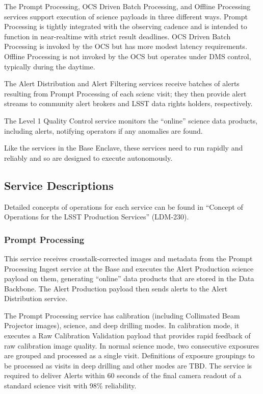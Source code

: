 \documentclass[DM,lsstdraft,toc]{lsstdoc}
\begin{document}
The Prompt Processing, OCS Driven Batch Processing, and Offline
Processing services support execution of science payloads in three
different ways. Prompt Processing is tightly integrated with the
observing cadence and is intended to function in near-realtime with
strict result deadlines. OCS Driven Batch Processing is invoked by the
OCS but has more modest latency requirements. Offline Processing is not
invoked by the OCS but operates under DMS control, typically during the
daytime.

The Alert Distribution and Alert Filtering services receive batches of
alerts resulting from Prompt Processing of each scienc visit; they then
provide alert streams to community alert brokers and LSST data rights
holders, respectively.

The Level 1 Quality Control service monitors the ``online'' science data
products, including alerts, notifying operators if any anomalies are
found.

Like the services in the Base Enclave, these services need to run
rapidly and reliably and so are designed to execute autonomously.

\subsection{Service Descriptions}\label{service-descriptions-1}

Detailed concepts of operations for each service can be found in
``Concept of Operations for the LSST Production Services'' (LDM-230).

\subsubsection{Prompt Processing}\label{prompt-processing}

This service receives crosstalk-corrected images and metadata from the
Prompt Processing Ingest service at the Base and executes the Alert
Production science payload on them, generating ``online'' data products
that are stored in the Data Backbone. The Alert Production payload then
sends alerts to the Alert Distribution service.

The Prompt Processing service has calibration (including Collimated Beam
Projector images), science, and deep drilling modes. In calibration
mode, it executes a Raw Calibration Validation payload that provides
rapid feedback of raw calibration image quality. In normal science mode,
two consecutive exposures are grouped and processed as a single visit.
Definitions of exposure groupings to be processed as visits in deep
drilling and other modes are TBD. The service is required to deliver
Alerts within 60 seconds of the final camera readout of a standard
science visit with 98\% reliability.
\end{document}
